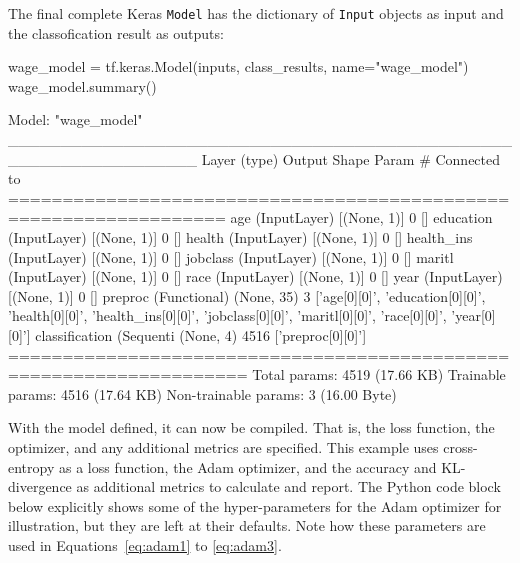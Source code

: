 The final complete Keras \texttt{Model} has the dictionary of \texttt{Input} objects as input and the classofication result as outputs:

\begin{pythoncode}
wage_model = tf.keras.Model(inputs, class_results, name="wage_model")
wage_model.summary()
\end{pythoncode}

\begin{textcode}
Model: "wage_model"
__________________________________________________________________
 Layer (type)             Output Shape  Param # Connected to                  
==================================================================
 age (InputLayer)         [(None, 1)]   0       []                            
 education (InputLayer)   [(None, 1)]   0       []                            
 health (InputLayer)      [(None, 1)]   0       []                            
 health_ins (InputLayer)  [(None, 1)]   0       []                            
 jobclass (InputLayer)    [(None, 1)]   0       []                            
 maritl (InputLayer)      [(None, 1)]   0       []                            
 race (InputLayer)        [(None, 1)]   0       []                            
 year (InputLayer)        [(None, 1)]   0       []                            
 preproc (Functional)     (None, 35)    3       ['age[0][0]',                 
                                                 'education[0][0]',           
                                                 'health[0][0]',              
                                                 'health_ins[0][0]',          
                                                 'jobclass[0][0]',            
                                                 'maritl[0][0]',              
                                                 'race[0][0]',                
                                                 'year[0][0]']                
 classification (Sequenti (None, 4)     4516    ['preproc[0][0]']           
====================================================================
Total params: 4519 (17.66 KB)
Trainable params: 4516 (17.64 KB)
Non-trainable params: 3 (16.00 Byte)
\end{textcode}

With the model defined, it can now be compiled. That is, the loss function, the optimizer, and any additional metrics are specified. This example uses cross-entropy as a loss function, the Adam optimizer, and the accuracy and KL-divergence as additional metrics to calculate and report. The Python code block below explicitly shows some of the hyper-parameters for the Adam optimizer for illustration, but they are left at their defaults. Note how these parameters are used in Equations~\ref{eq:adam1} to \ref{eq:adam3}.

